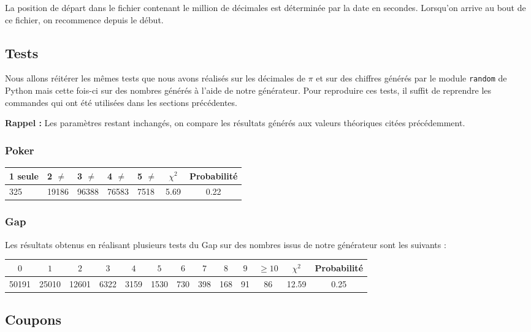 \documentclass[12pt,a4paper]{article}
\begin{document}
La position de départ dans le fichier contenant le million de décimales
est déterminée par la date en secondes. Lorsqu'on arrive au bout de ce fichier,
on recommence depuis le début.

\subsection{Tests}
Nous allons réitérer les mêmes tests que nous avons réalisés sur les décimales
de $\pi$ et sur des chiffres générés par le module \texttt{random} de Python
mais cette fois-ci sur des nombres générés à l'aide de notre générateur.
Pour reproduire ces tests, il suffit de reprendre les commandes qui ont été utilisées dans les sections précédentes.

\textbf{Rappel :} Les paramètres restant inchangés, on compare
les résultats générés aux valeurs théoriques citées précédemment.
\subsubsection{Poker}

\begin{center}
\begin{tabular}{l|l|l|l|l|c|c}
1 seule & 2 $\neq$ & 3 $\neq$ & 4 $\neq$ & 5 $\neq$
	& $\chi^2$ & Probabilité \\ \hline
325 & 19186 & 96388 & 76583 & 7518 &  5.69 &  0.22
\end{tabular}
\end{center}

\subsubsection{Gap}

Les résultats obtenus en réalisant plusieurs tests du Gap sur des nombres issus
de notre générateur sont les suivants :

\begin{center}
\begin{tabular}{c|c|c|c|c|c|c|c|c|c|c|c|c}
$0$ & $1$ & $2$ & $3$ & $4$ & $5$ & $6$ & $7$ & $8$ & $9$ & $\geq 10$ &
	$\chi^2$ & Probabilité \\ \hline
50191 & 25010 & 12601 & 6322 & 3159 & 1530 & 730 & 398 & 168 & 91 & 86 &
	12.59 &  0.25
\end{tabular}
\end{center}

\subsection{Coupons}
\end{document}
